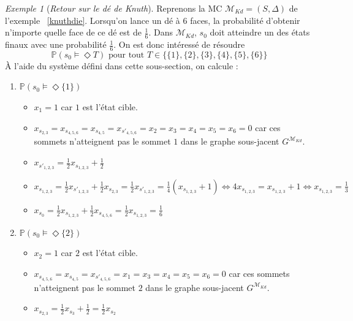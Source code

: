 \documentclass[12pt,a4paper]{report}
\theoremstyle{definition}%
\theoremstyle{remark}
\newtheorem{example}{Exemple}[chapter]
\let\labelitemi\labelitemii
\begin{document}
\begin{example}[\textit{Retour sur le dé de Knuth}]
	Reprenons la MC $\mathcal{M}_{Kd} = (S, \Delta)$ de l'exemple ~\ref{knuthdie}. Lorsqu'on lance un dé à $6$ faces, la probabilité d'obtenir n'importe quelle face de ce dé est de $\frac{1}{6}$. Dans $\mathcal{M}_{Kd}$, $s_0$ doit atteindre un des états finaux avec une probabilité $\frac{1}{6}$. On est donc intéressé de résoudre \[\mathbb{P}(s_0 \models \Diamond T) \text{ pour tout }T \in \{\{1\},\{2\},\{3\},\{4\},\{5\},\{6\}\} \]
	\`A l'aide du système défini dans cette sous-section, on calcule :
	\begin{spacing}{1.5}
	\begin{enumerate}
		\item $\mathbb{P}(s_0 \models \Diamond \{1\})$
		\begin{itemize}
			\renewcommand{\labelitemi}{\tiny$\bullet$}
			\item $x_1 = 1 $ car $1$ est l'état cible.
			\item $x_{s_{2, 3}} = x_{s_{4, 5, 6}} = x_{s_{4, 5}} = x_{s'_{4, 5, 6}} = x_2 = x_3 = x_4 = x_5 = x_6 = 0$ car ces sommets n'atteignent pas le sommet $1$ dans le graphe sous-jacent $G^{\mathcal{M}_{Kd}}$.
			\item $x_{s'_{1, 2, 3}} = \frac{1}{2} x_{s_{1, 2, 3}} + \frac{1}{2}$
			\item $x_{s_{1, 2, 3}} = \frac{1}{2} x_{s'_{1, 2, 3}} + \frac{1}{2}x_{s_{2, 3}} = \frac{1}{2} x_{s'_{1, 2, 3}} = \frac{1}{4} (x_{s_{1, 2, 3}} + 1) \Leftrightarrow
			4 x_{s_{1, 2, 3}} =x_{s_{1, 2, 3}} + 1 \Leftrightarrow x_{s_{1, 2, 3}} = \frac{1}{3}$
			\item $x_{s_0} = \frac{1}{2} x_{s_{1,2,3}} + \frac{1}{2} x_{s_{4, 5, 6}} = \frac{1}{2} x_{s_{1,2,3}} = \frac{1}{6}$
		\end{itemize}
		\item $\mathbb{P}(s_0 \models \Diamond \{2\})$
		\begin{itemize}
			\renewcommand{\labelitemi}{\tiny$\bullet$}
			\item $x_2 = 1 $ car $2$ est l'état cible.
			\item $x_{s_{4, 5, 6}} = x_{s_{4, 5}} = x_{s'_{4, 5, 6}} = x_1 = x_3 = x_4 = x_5 = x_6 = 0$ car ces sommets n'atteignent pas le sommet $2$ dans le graphe sous-jacent $G^{\mathcal{M}_{Kd}}$.
			\item $x_{s_{2, 3}} = \frac{1}{2} x_{s_3}  + \frac{1}{2} = \frac{1}{2} x_{s_2}$

\end{itemize}
\end{enumerate}
\end{spacing}
\end{example}
\end{document}

